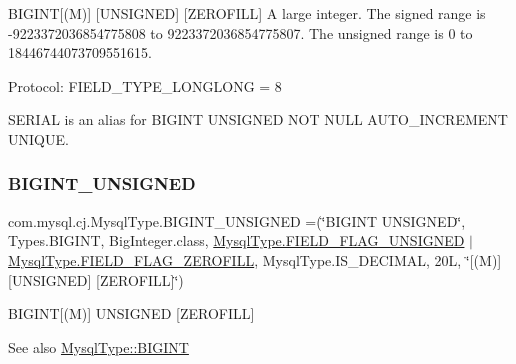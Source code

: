 B\+I\+G\+I\+NT\mbox{[}(M)\mbox{]} \mbox{[}U\+N\+S\+I\+G\+N\+ED\mbox{]} \mbox{[}Z\+E\+R\+O\+F\+I\+LL\mbox{]} A large integer. The signed range is -\/9223372036854775808 to 9223372036854775807. The unsigned range is 0 to 18446744073709551615.

Protocol\+: F\+I\+E\+L\+D\+\_\+\+T\+Y\+P\+E\+\_\+\+L\+O\+N\+G\+L\+O\+NG = 8

S\+E\+R\+I\+AL is an alias for B\+I\+G\+I\+NT U\+N\+S\+I\+G\+N\+ED N\+OT N\+U\+LL A\+U\+T\+O\+\_\+\+I\+N\+C\+R\+E\+M\+E\+NT U\+N\+I\+Q\+UE. \mbox{\label{enumcom_1_1mysql_1_1cj_1_1_mysql_type_a4cb24739cd3da8ce7e10b6cdb0e13765}} 
\subsubsection{\texorpdfstring{B\+I\+G\+I\+N\+T\+\_\+\+U\+N\+S\+I\+G\+N\+ED}{BIGINT\_UNSIGNED}}
{\footnotesize\ttfamily com.\+mysql.\+cj.\+Mysql\+Type.\+B\+I\+G\+I\+N\+T\+\_\+\+U\+N\+S\+I\+G\+N\+ED =(\char`\"{}B\+I\+G\+I\+NT U\+N\+S\+I\+G\+N\+ED\char`\"{}, Types.\+B\+I\+G\+I\+NT, Big\+Integer.\+class, \mbox{\hyperlink{enumcom_1_1mysql_1_1cj_1_1_mysql_type_a2c6701614559b1ad9955cdc4ca6337e2}{Mysql\+Type.\+F\+I\+E\+L\+D\+\_\+\+F\+L\+A\+G\+\_\+\+U\+N\+S\+I\+G\+N\+ED}} $\vert$ \mbox{\hyperlink{enumcom_1_1mysql_1_1cj_1_1_mysql_type_abb76a1f2f3dac9a30d1b559b8ba66a48}{Mysql\+Type.\+F\+I\+E\+L\+D\+\_\+\+F\+L\+A\+G\+\_\+\+Z\+E\+R\+O\+F\+I\+LL}}, Mysql\+Type.\+I\+S\+\_\+\+D\+E\+C\+I\+M\+AL, 20\+L, \char`\"{}\mbox{[}(\+M)\mbox{]} \mbox{[}\+U\+N\+S\+I\+G\+N\+E\+D\mbox{]} \mbox{[}\+Z\+E\+R\+O\+F\+I\+L\+L\mbox{]}\char`\"{})}

B\+I\+G\+I\+NT\mbox{[}(M)\mbox{]} U\+N\+S\+I\+G\+N\+ED \mbox{[}Z\+E\+R\+O\+F\+I\+LL\mbox{]}

\begin{DoxySeeAlso}{See also}
\mbox{\hyperlink{enumcom_1_1mysql_1_1cj_1_1_mysql_type_a5e0b78b90c1ad86e03b108c01d729118}{Mysql\+Type\+::\+B\+I\+G\+I\+NT}} 
\end{DoxySeeAlso}
\mbox{\label{enumcom_1_1mysql_1_1cj_1_1_mysql_type_ac5a30a348c2d7efaefa81040b53513a7}} 
